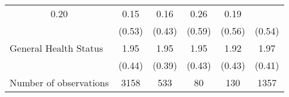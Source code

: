 \begin{tabular}{llllll}
  \multicolumn{1}{|c}{0.20} &
  \multicolumn{1}{c}{0.15} &
  \multicolumn{1}{c}{0.16} &
  \multicolumn{1}{c}{0.26} &
  \multicolumn{1}{c}{0.19} \\
\multicolumn{1}{l}{} &
  \multicolumn{1}{|c}{(0.53)} &
  \multicolumn{1}{c}{(0.43)} &
  \multicolumn{1}{c}{(0.59)} &
  \multicolumn{1}{c}{(0.56)} &
  \multicolumn{1}{c}{(0.54)} \\
\multicolumn{1}{l}{General Health Status} &
  \multicolumn{1}{|c}{1.95} &
  \multicolumn{1}{c}{1.95} &
  \multicolumn{1}{c}{1.95} &
  \multicolumn{1}{c}{1.92} &
  \multicolumn{1}{c}{1.97} \\
\multicolumn{1}{l}{} &
  \multicolumn{1}{|c}{(0.44)} &
  \multicolumn{1}{c}{(0.39)} &
  \multicolumn{1}{c}{(0.43)} &
  \multicolumn{1}{c}{(0.43)} &
  \multicolumn{1}{c}{(0.41)} \\
\multicolumn{1}{c}{Number of observations} &
  \multicolumn{1}{|c}{3158} &
  \multicolumn{1}{c}{533} &
  \multicolumn{1}{c}{80} &
  \multicolumn{1}{c}{130} &
  \multicolumn{1}{c}{1357} \\
\cline{1-6}
\end{tabular}
